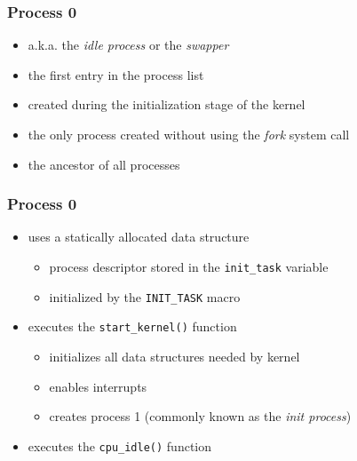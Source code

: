 \documentclass[dvipsnames]{beamer}
\begin{document}
\begin{frame}
  \frametitle{Process 0}

  \begin{itemize}
    \item a.k.a. the \textit{idle process} or the \textit{swapper}
    \item the first entry in the process list
    \item created during the initialization stage of the kernel
    \item the only process created without using the \textit{fork} system call
    \item the ancestor of all processes
  \end{itemize}
\end{frame}

\begin{frame}
  \frametitle{Process 0}

  \begin{itemize}
    \item uses a statically allocated data structure
    \begin{itemize}
      \item process descriptor stored in the \lstinline|init_task| variable
      \item initialized by the \lstinline|INIT_TASK| macro
    \end{itemize}

    \item executes the \lstinline|start_kernel()| function
    \begin{itemize}
      \item initializes all data structures needed by kernel
      \item enables interrupts
      \item creates process 1 (commonly known as the \textit{init process})
    \end{itemize}

    \item executes the \lstinline|cpu_idle()| function
  \end{itemize}
\end{frame}
\end{document}

